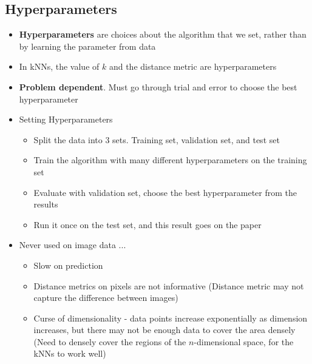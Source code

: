 \subsection{Hyperparameters}
\begin{itemize}
	\item \textbf{Hyperparameters} are choices about the algorithm that we set, rather than by learning the parameter from data
	\item In kNNs, the value of $k$ and the distance metric are hyperparameters
	\item \textbf{Problem dependent}. Must go through trial and error to choose the best hyperparameter
	\item Setting Hyperparameters
	\begin{itemize}
		\item Split the data into 3 sets. Training set, validation set, and test set
		\item Train the algorithm with many different hyperparameters on the training set
		\item Evaluate with validation set, choose the best hyperparameter from the results
		\item Run it once on the test set, and this result goes on the paper
	\end{itemize}
	\item Never used on image data ...
	\begin{itemize}
		\item Slow on prediction
		\item Distance metrics on pixels are not informative (Distance metric may not capture the difference between images)
		\item Curse of dimensionality - data points increase exponentially as dimension increases, but there may not be enough data to cover the area densely (Need to densely cover the regions of the $n$-dimensional space, for the kNNs to work well)
	\end{itemize}
\end{itemize}


